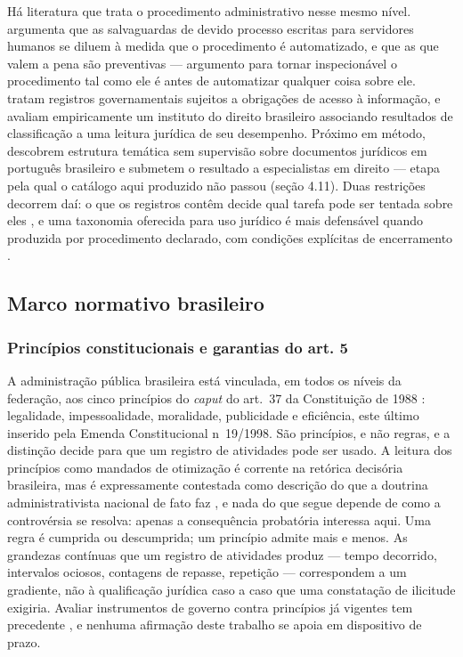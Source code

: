 Há literatura que trata o procedimento administrativo nesse mesmo nível.
 argumenta que as salvaguardas de devido processo escritas para
servidores humanos se diluem à medida que o procedimento é automatizado, e que as que valem a pena
são preventivas --- argumento para tornar inspecionável o procedimento tal como ele é antes de
automatizar qualquer coisa sobre ele.  tratam registros
governamentais sujeitos a obrigações de acesso à informação, e 
avaliam empiricamente um instituto do direito brasileiro associando resultados de classificação a
uma leitura jurídica de seu desempenho. Próximo em método,  descobrem
estrutura temática sem supervisão sobre documentos jurídicos em português brasileiro e submetem o
resultado a especialistas em direito --- etapa pela qual o catálogo aqui produzido não passou (seção
4.11). Duas restrições decorrem daí: o que os registros contêm decide qual tarefa pode ser tentada
sobre eles \cite{medvedeva2023rethinking}, e uma taxonomia oferecida para uso jurídico é mais
defensável quando produzida por procedimento declarado, com condições explícitas de encerramento
\cite{nickerson2013taxonomy}.

\subsection{Marco normativo brasileiro}
\label{sec:rev-normativo}

\subsubsection{Princípios constitucionais e garantias do art. 5\textordmasculine{}}

A administração pública brasileira está vinculada, em todos os níveis da federação, aos cinco
princípios do \emph{caput} do art.~37 da Constituição de 1988 \cite{brasil1988cf}: legalidade,
impessoalidade, moralidade, publicidade e eficiência, este último inserido pela Emenda
Constitucional n\textordmasculine{}~19/1998. São princípios, e não regras, e a distinção decide
para que um registro de atividades pode ser usado. A leitura dos princípios como mandados de otimização é
corrente na retórica decisória brasileira, mas é expressamente contestada como descrição do que a
doutrina administrativista nacional de fato faz \cite{brgabardo2017eficiencia}, e nada do que segue
depende de como a controvérsia se resolva: apenas a consequência probatória interessa aqui. Uma
regra é cumprida ou descumprida; um princípio admite mais e menos. As grandezas contínuas que um registro de atividades
produz --- tempo decorrido, intervalos ociosos, contagens de repasse, repetição --- correspondem a
um gradiente, não à qualificação jurídica caso a caso que uma constatação de ilicitude exigiria.
Avaliar instrumentos de governo contra princípios já vigentes tem precedente
\cite{oswald2018algorithm}, e nenhuma afirmação deste trabalho se apoia em dispositivo de prazo.

